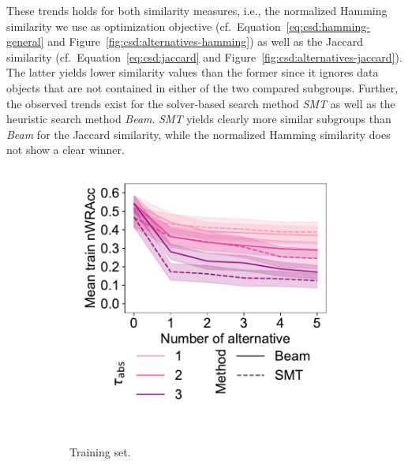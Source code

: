 \documentclass{article}
\theoremstyle{definition}
\begin{document}
These trends holds for both similarity measures, i.e., the normalized Hamming similarity we use as optimization objective (cf.~Equation~\ref{eq:csd:hamming-general} and Figure~\ref{fig:csd:alternatives-hamming}) as well as the Jaccard similarity (cf.~Equation~\ref{eq:csd:jaccard} and Figure~\ref{fig:csd:alternatives-jaccard}).
The latter yields lower similarity values than the former since it ignores data objects that are not contained in either of the two compared subgroups.
Further, the observed trends exist for the solver-based search method \emph{SMT} as well as the heuristic search method \emph{Beam}.
\emph{SMT} yields clearly more similar subgroups than \emph{Beam} for the Jaccard similarity, while the normalized Hamming similarity does not show a clear winner.

\begin{figure}[t]
	\centering
	\begin{subfigure}[t]{0.48\textwidth}
		\centering
		\includegraphics[width=\textwidth, trim=20 50 15 15, clip]{plots/csd-alternatives-train-nwracc.pdf}
		\caption{Training set.}
		\label{fig:csd:alternatives-train-nwracc}
	\end{subfigure}
	\hfill
	\begin{subfigure}[t]{0.48\textwidth}
		\centering

\end{subfigure}
\end{figure}
\end{document}
